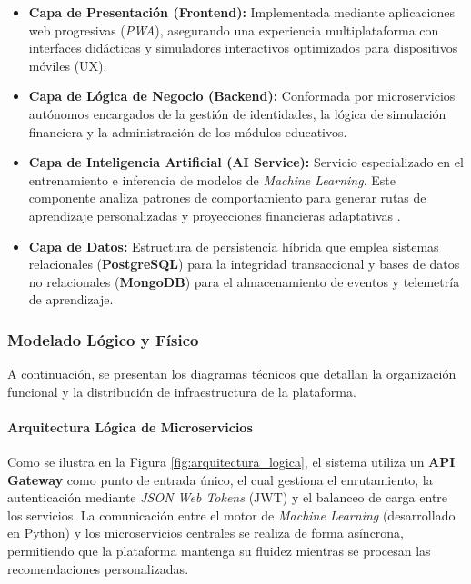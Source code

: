 \begin{itemize}
	\item \textbf{Capa de Presentación (Frontend):} Implementada mediante aplicaciones web progresivas (\textit{PWA}), asegurando una experiencia multiplataforma con interfaces didácticas y simuladores interactivos optimizados para dispositivos móviles (UX).
	\item \textbf{Capa de Lógica de Negocio (Backend):} Conformada por microservicios autónomos encargados de la gestión de identidades, la lógica de simulación financiera y la administración de los módulos educativos.
	\item \textbf{Capa de Inteligencia Artificial (AI Service):} Servicio especializado en el entrenamiento e inferencia de modelos de \textit{Machine Learning}. Este componente analiza patrones de comportamiento para generar rutas de aprendizaje personalizadas y proyecciones financieras adaptativas \parencite{BBVAResearch01}.
	\item \textbf{Capa de Datos:} Estructura de persistencia híbrida que emplea sistemas relacionales (\textbf{PostgreSQL}) para la integridad transaccional y bases de datos no relacionales (\textbf{MongoDB}) para el almacenamiento de eventos y telemetría de aprendizaje.
\end{itemize}

{}
\subsubsection*{Modelado Lógico y Físico}

A continuación, se presentan los diagramas técnicos que detallan la organización funcional y la distribución de infraestructura de la plataforma.

\paragraph*{Arquitectura Lógica de Microservicios}
Como se ilustra en la Figura \ref{fig:arquitectura_logica}, el sistema utiliza un \textbf{API Gateway} como punto de entrada único, el cual gestiona el enrutamiento, la autenticación mediante \textit{JSON Web Tokens} (JWT) y el balanceo de carga entre los servicios. La comunicación entre el motor de \textit{Machine Learning} (desarrollado en Python) y los microservicios centrales se realiza de forma asíncrona, permitiendo que la plataforma mantenga su fluidez mientras se procesan las recomendaciones personalizadas.

